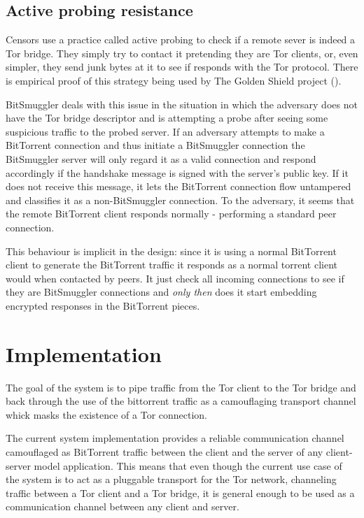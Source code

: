 \documentclass[11pt]{article} %
\newcommand{\projectName}{BitSmuggler }
\begin{document}
\label{subsec:steganography}


\subsection{Active probing resistance}
\label{subsec:activeProbingResist}

Censors use a practice called active probing to check if  a remote sever is indeed a Tor bridge. They simply try to contact it pretending they are Tor clients, or, even simpler, they send junk bytes at it to see if responds with the Tor protocol. There is empirical proof of this strategy being used by The Golden Shield project (\citep*{web:bridgeKnock}).

\projectName deals with this issue in the situation in which the adversary does not have the Tor bridge descriptor and is attempting a probe after seeing some suspicious traffic to the probed server. If an adversary attempts to make a BitTorrent connection and thus initiate a \projectName connection the \projectName server will only regard it as a valid connection and respond accordingly if the handshake message is signed  with the server's public key.  If it does not receive this message, it lets the BitTorrent connection flow untampered and classifies it as a non-\projectName connection. To the adversary, it seems that the remote BitTorrent client responds normally - performing a standard peer connection.

This behaviour is implicit in the design: since it is using a normal BitTorrent client to generate the BitTorrent traffic it responds as a normal torrent client would when contacted by peers. It just check all incoming connections to see if they are \projectName connections and \textit{only then} does it start embedding encrypted responses in the BitTorrent pieces.

\section{Implementation}

The goal of the system is to pipe traffic from the Tor client to the Tor bridge and back through the use of the bittorrent traffic as a camouflaging transport channel whick masks the existence of a Tor connection.

The current system implementation provides a reliable communication channel camouflaged as BitTorrent traffic between the client and the server of any client-server model application. This means that even though the current use case of the system is to act as a pluggable transport for the Tor network, channeling traffic between a Tor client and a Tor bridge, it is general enough to be used as a communication channel between any client and server.
\end{document}
